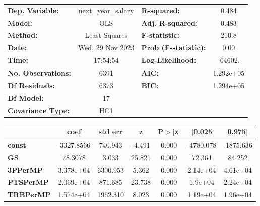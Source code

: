 \begin{center}
\begin{tabular}{lclc}
\toprule
\textbf{Dep. Variable:}             & next\_year\_salary & \textbf{  R-squared:         } &     0.484   \\
\textbf{Model:}                     &        OLS         & \textbf{  Adj. R-squared:    } &     0.483   \\
\textbf{Method:}                    &   Least Squares    & \textbf{  F-statistic:       } &     210.8   \\
\textbf{Date:}                      &  Wed, 29 Nov 2023  & \textbf{  Prob (F-statistic):} &     0.00    \\
\textbf{Time:}                      &      17:54:54      & \textbf{  Log-Likelihood:    } &   -64602.   \\
\textbf{No. Observations:}          &         6391       & \textbf{  AIC:               } & 1.292e+05   \\
\textbf{Df Residuals:}              &         6373       & \textbf{  BIC:               } & 1.294e+05   \\
\textbf{Df Model:}                  &           17       & \textbf{                     } &             \\
\textbf{Covariance Type:}           &        HC1         & \textbf{                     } &             \\
\bottomrule
\end{tabular}
\begin{tabular}{lcccccc}
                                    & \textbf{coef} & \textbf{std err} & \textbf{z} & \textbf{P$> |$z$|$} & \textbf{[0.025} & \textbf{0.975]}  \\
\midrule
\textbf{const}                      &   -3327.8566  &      740.943     &    -4.491  &         0.000        &    -4780.078    &    -1875.636     \\
\textbf{GS}                         &      78.3078  &        3.033     &    25.821  &         0.000        &       72.364    &       84.252     \\
\textbf{3PPerMP}                    &    3.378e+04  &     6300.953     &     5.362  &         0.000        &     2.14e+04    &     4.61e+04     \\
\textbf{PTSPerMP}                   &    2.069e+04  &      871.685     &    23.738  &         0.000        &      1.9e+04    &     2.24e+04     \\
\textbf{TRBPerMP}                   &    1.574e+04  &     1962.310     &     8.023  &         0.000        &     1.19e+04    &     1.96e+04     \\

\end{tabular}
\end{center}
